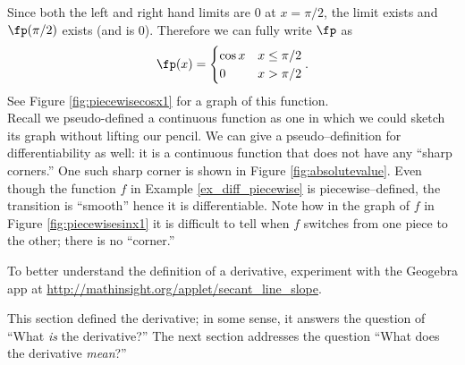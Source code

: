 {%
Since both the left and right hand limits are 0 at $x=\pi/2$, the limit exists and $\fp(\pi/2)$ exists (and is 0). Therefore we can fully write $\fp$ as $$\fp(x) = \begin{cases}\cos x & x\leq\pi/2\\ 0 & x>\pi/2\end{cases}.$$ See Figure \ref{fig:piecewisecosx1} for a graph of this function.
}\\

Recall we pseudo-defined a continuous function as one in which we could sketch its graph without lifting our pencil. We can give a pseudo--definition for differentiability as well: it is a continuous function that does not have any ``sharp corners.'' One such sharp corner is shown in Figure \ref{fig:absolutevalue}. Even though the function $f$ in Example \ref{ex_diff_piecewise} is piecewise--defined, the transition is ``smooth'' hence it is differentiable. Note how in the graph of $f$ in Figure \ref{fig:piecewisesinx1} it is difficult to tell when $f$ switches from one piece to the other; there is no ``corner.''

To better understand the definition of a derivative, experiment with the Geogebra app
at \url{http://mathinsight.org/applet/secant_line_slope}.


This section defined the derivative; in some sense, it answers the question of ``What \textit{is} the derivative?'' The next section addresses the question ``What does the derivative \textit{mean}?''




